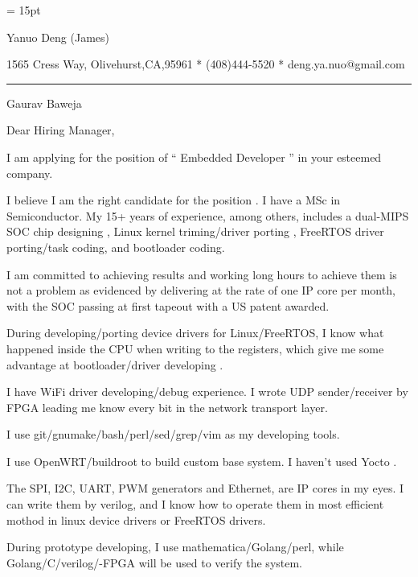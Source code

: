 

  \FFrg \baselineskip = 15pt

{
Yanuo Deng (James)
}

{ 
1565 Cress Way, Olivehurst,CA,95961
*
(408)444-5520
*
deng.ya.nuo@gmail.com
}

{ \smallbreak } 

{\par\noindent\hrule} 

{ \bigbreak } 



Gaurav Baweja

{ 
Dear Hiring Manager,
}

{ \bigbreak } 
I am applying for the position of `` Embedded Developer '' in your esteemed company.

{ \bigbreak } 
I believe I am the right candidate for the position .
I have a MSc in Semiconductor.
My 15+ years of experience, among others, 
includes a dual-MIPS SOC chip designing ,
Linux kernel triming/driver porting , 
FreeRTOS driver porting/task coding,
and bootloader coding.

{ \bigbreak } 
I am committed to achieving results and working long hours 
to achieve them is not a problem as evidenced by 
delivering at the rate of one IP core per month,
with the SOC passing at first tapeout
with a US patent awarded.

{ \bigbreak } 
During developing/porting device drivers for Linux/FreeRTOS,
I know what happened inside the CPU when writing to the registers,
which give me some advantage at bootloader/driver developing .

{ \bigbreak } 
I have WiFi driver developing/debug experience. 
I wrote UDP sender/receiver by FPGA leading me know every bit in the network transport layer.

{ \bigbreak } 
I use git/gnumake/bash/perl/sed/grep/vim as my developing tools.

{ \bigbreak } 
I use OpenWRT/buildroot to build custom base system. I haven't used Yocto .

{ \bigbreak } 
The SPI, I2C, UART, PWM generators and Ethernet, are IP cores in my eyes.
I can write them by verilog, 
and I know how to operate them in most efficient mothod
in linux device drivers or FreeRTOS drivers.

{ \bigbreak } 
During prototype developing, I use mathematica/Golang/perl, 
while Golang/C/verilog/-FPGA will be used to verify the system.

